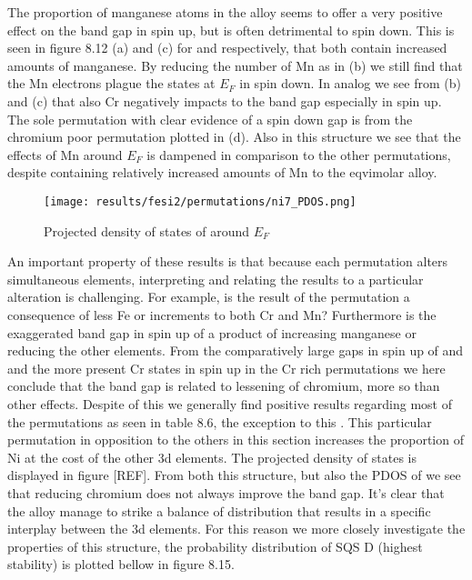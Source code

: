 The proportion of manganese atoms in the alloy seems to offer a very positive effect on the band gap in spin up, but is often detrimental to spin down. This is seen in figure 8.12 (a) and (c) for  and  respectively, that both contain increased amounts of manganese. By reducing the number of Mn as in (b) we still find that the Mn electrons plague the states at $E_F$ in spin down. In analog we see from (b) and (c) that also Cr negatively impacts to the band gap especially in spin up. The sole permutation with clear evidence of a spin down gap is from the chromium poor permutation plotted in (d). Also in this structure we see that the effects of Mn around $E_F$ is dampened in comparison to the other permutations, despite containing relatively increased amounts of Mn to the eqvimolar alloy.  

\begin{figure}[H]
	\centering
	\texttt{[image: results/fesi2/permutations/ni7\_PDOS.png]}
	\caption{Projected density of states of  around $E_F$}
\end{figure}

An important property of these results is that because each permutation alters simultaneous elements, interpreting and relating the results to a particular alteration is challenging. For example, is the result of the  permutation a consequence of less Fe or increments to both Cr and Mn? Furthermore is the exaggerated band gap in spin up of  a product of increasing manganese or reducing the other elements. From the comparatively large gaps in spin up of  and  and the more present Cr states in spin up in the Cr rich permutations we here conclude that the band gap is related to lessening of chromium, more so than other effects. Despite of this we generally find positive results regarding most of the permutations as seen in table 8.6, the exception to this . This particular permutation in opposition to the others in this section increases the proportion of Ni at the cost of the other 3d elements. The projected density of states is displayed in figure [REF]. From both this structure, but also the PDOS of  we see that reducing chromium does not always improve the band gap. It's clear that the  alloy manage to strike a balance of distribution that results in a specific interplay between the 3d elements. For this reason we more closely investigate the properties of this structure, the probability distribution of SQS D (highest stability) is plotted bellow in figure 8.15.

